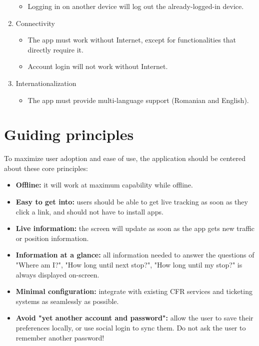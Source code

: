 \begin{enumerate}
\begin{itemize}
              \item Logging in on another device will log out the already-logged-in device.
          \end{itemize}
    \item Connectivity
          \begin{itemize}
              \item The app must work without Internet, except for functionalities that directly require it.
              \item Account login will not work without Internet.
          \end{itemize}
          \item{Internationalization}
          \begin{itemize}
              \item The app must provide multi-language support (Romanian and English).
          \end{itemize}
\end{enumerate}

\section{Guiding principles}

To maximize user adoption and ease of use, the application should be centered about these core principles:

\begin{itemize}
    \item \textbf{Offline:} it will work at maximum capability while offline.
    \item \textbf{Easy to get into:} users should be able to get live tracking as soon as they click a link, and should not have to install apps.
    \item \textbf{Live information:} the screen will update as soon as the app gets new traffic or position information.
    \item \textbf{Information at a glance:} all information needed to answer the questions of "Where am I?", "How long until next stop?", "How long until my stop?" is always displayed on-screen.
    \item \textbf{Minimal configuration:} integrate with existing CFR services and ticketing systems as seamlessly as possible.
    \item \textbf{Avoid "yet another account and password":} allow the user to save their preferences locally, or use social login to sync them. Do not ask the user to remember another password!
\end{itemize}

